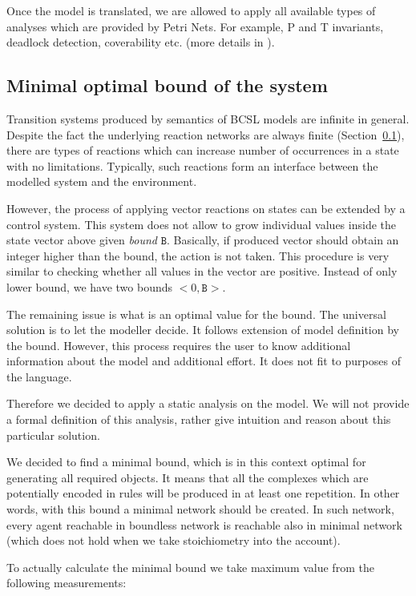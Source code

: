 \documentclass[12pt, twoside]{fithesis2} %
\begin{document}
Once the model is translated, we are allowed to apply all available types of analyses which are provided by Petri Nets. For example, P and T invariants, deadlock detection, coverability etc. (more details in \cite{petri}).

\subsection{Minimal optimal bound of the system}
\label{optimal_bound}

Transition systems produced by semantics of BCSL models are infinite in general. Despite the fact the underlying reaction networks are always finite (Section~\ref{optimal_bound}), there are types of reactions which can increase number of occurrences in a state with no limitations. Typically, such reactions form an interface between the modelled system and the environment.

However, the process of applying vector reactions on states can be extended by a control system. This system does not allow to grow individual values inside the state vector above given \emph{bound} $\mathtt{B}$. Basically, if produced vector should obtain an integer higher than the bound, the action is not taken. This procedure is very similar to checking whether all values in the vector are positive. Instead of only lower bound, we have two bounds $<0, \mathtt{B}>$.

The remaining issue is what is an optimal value for the bound. The universal solution is to let the modeller decide. It follows extension of model definition by the bound. However, this process requires the user to know additional information about the model and additional effort. It does not fit to purposes of the language.

Therefore we decided to apply a static analysis on the model. We will not provide a formal definition of this analysis, rather give intuition and reason about this particular solution.

We decided to find a minimal bound, which is in this context optimal for generating all required objects. It means that all the complexes which are potentially encoded in rules  will be produced in at least one repetition. In other words, with this bound a minimal network should be created. In such network, every agent reachable in boundless network is reachable also in minimal network (which does not hold when we take stoichiometry into the account).

To actually calculate the minimal bound we take maximum value from the following measurements:
\end{document}
